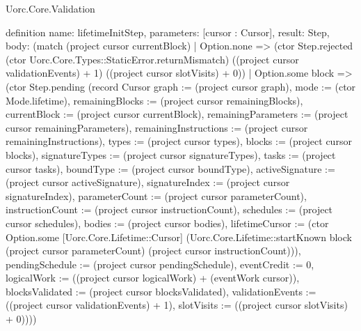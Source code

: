 \begin{lexlean}{Uorc.Core.Validation}
\begin{semanticmodule}
definition{
  name: lifetimeInitStep,
  parameters: [cursor : Cursor],
  result: Step,
  body: (match (project cursor currentBlock)
    | Option.none => (ctor Step.rejected (ctor Uorc.Core.Types::StaticError.returnMismatch) ((project cursor validationEvents) + 1) ((project cursor slotVisits) + 0))
    | Option.some block => (ctor Step.pending (record Cursor {graph := (project cursor graph), mode := (ctor Mode.lifetime), remainingBlocks := (project cursor remainingBlocks), currentBlock := (project cursor currentBlock), remainingParameters := (project cursor remainingParameters), remainingInstructions := (project cursor remainingInstructions), types := (project cursor types), blocks := (project cursor blocks), signatureTypes := (project cursor signatureTypes), tasks := (project cursor tasks), boundType := (project cursor boundType), activeSignature := (project cursor activeSignature), signatureIndex := (project cursor signatureIndex), parameterCount := (project cursor parameterCount), instructionCount := (project cursor instructionCount), schedules := (project cursor schedules), bodies := (project cursor bodies), lifetimeCursor := (ctor Option.some [Uorc.Core.Lifetime::Cursor] (Uorc.Core.Lifetime::startKnown block (project cursor parameterCount) (project cursor instructionCount))), pendingSchedule := (project cursor pendingSchedule), eventCredit := 0, logicalWork := ((project cursor logicalWork) + (eventWork cursor)), blocksValidated := (project cursor blocksValidated), validationEvents := ((project cursor validationEvents) + 1), slotVisits := ((project cursor slotVisits) + 0)})))
}


\end{semanticmodule}
\end{lexlean}
